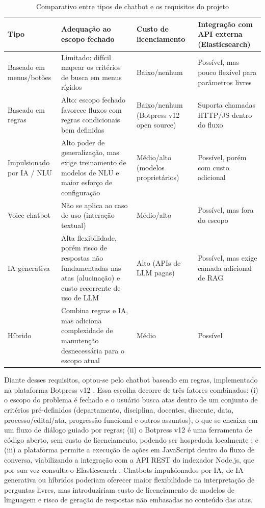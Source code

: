 \begin{landscape}
\begin{table}[H]
  \centering
  \caption{Comparativo entre tipos de chatbot e os requisitos do projeto}
  \label{tab:comparativo-chatbots}
  \begin{tabular}{p{4cm}p{7.5cm}p{3cm}p{6cm}}
    \hline
    \textbf{Tipo} & \textbf{Adequação ao escopo fechado} & \textbf{Custo de licenciamento} & \textbf{Integração com API externa (Elasticsearch)} \\
    \hline
    Baseado em menus/botões & Limitado: difícil mapear os critérios de busca em menus rígidos & Baixo/nenhum & Possível, mas pouco flexível para parâmetros livres \\
    Baseado em regras & Alto: escopo fechado favorece fluxos com regras condicionais bem definidas & Baixo/nenhum (Botpress v12 open source) & Suporta chamadas HTTP/JS dentro do fluxo \\
    Impulsionado por IA / NLU & Alto poder de generalização, mas exige treinamento de modelos de NLU e maior esforço de configuração & Médio/alto (modelos proprietários) & Possível, porém com custo adicional \\
    Voice chatbot & Não se aplica ao caso de uso (interação textual) & Médio/alto & Possível, mas fora do escopo \\
    IA generativa & Alta flexibilidade, porém risco de respostas não fundamentadas nas atas (alucinação) e custo recorrente de uso de LLM & Alto (APIs de LLM pagas) & Possível, mas exige camada adicional de RAG \\
    Híbrido & Combina regras e IA, mas adiciona complexidade de manutenção desnecessária para o escopo atual & Médio & Possível \\
    \hline
  \end{tabular}
\end{table}
\end{landscape}

Diante desses requisitos, optou-se pelo chatbot baseado em regras, implementado na plataforma Botpress v12 \cite{botpress-about, botpress-docs}. Essa escolha decorre de três fatores combinados: (i) o escopo do problema é fechado e o usuário busca atas dentro de um conjunto de critérios pré-definidos (departamento, disciplina, docentes, discente, data, processo/edital/ata, progressão funcional e outros assuntos), o que se encaixa em um fluxo de diálogo guiado por regras; (ii) o Botpress v12 é uma ferramenta de código aberto, sem custo de licenciamento, podendo ser hospedada localmente \cite{botpress-about}; e (iii) a plataforma permite a execução de ações em JavaScript dentro do fluxo de conversa, viabilizando a integração com a API REST do indexador Node.js, que por sua vez consulta o Elasticsearch \cite{IBMElasticsearch}. Chatbots impulsionados por IA, de IA generativa ou híbridos poderiam oferecer maior flexibilidade na interpretação de perguntas livres, mas introduziriam custo de licenciamento de modelos de linguagem e risco de geração de respostas não embasadas no conteúdo das atas.

